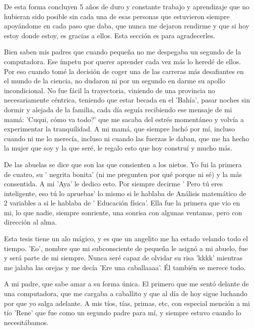 \begin{acknowledgements}
    De esta forma concluyen 5 años de duro y constante trabajo y aprendizaje que no hubieran sido posible sin cada una de esas personas que estuvieron siempre apoyándome en cada paso que daba, que nunca me dejaron rendirme y que si hoy estoy donde estoy, es gracias a ellos. Esta sección es para agradecerles.

    Bien saben mis padres que cuando pequeña no me despegaba un segundo de la computadora. Ese ímpetu por querer aprender cada vez más lo heredé de ellos. Por eso cuando tomé la decisión de coger una de las carreras más desafiantes en el mundo de la ciencia, no dudaron ni por un segundo en darme su apollo incondicional. No fue fácil la trayectoria, viniendo de una provincia no necesariamente céntrica, teniendo que estar becada en el 'Bahía', pasar noches sin dormir y alejada de la familia, cada día seguía recibiendo ese mensaje de mi mamá: 'Cuqui, cómo va todo?' que me sacaba del estrés momentáneo y volvía a experimentar la tranquilidad. A mi mamá, que siempre luchó por mí, incluso cuando ni me lo merecía, incluso ni cuando las fuerzas le daban, que me ha hecho la mujer que soy y la que seré, le regalo esto que hoy construí y mucho más.

    De las abuelas se dice que son las que consienten a los nietos. Yo fui la primera de cuatro, su ' negrita bonita' (ni me pregunten por qué porque ni sé) y la más consentida. A mi 'Aya' le dedico esto. Por siempre decirme ' Pero tú eres inteligente, eso tú lo apruebas' lo mismo si le hablaba de Análisis matemático de 2 variables a si le hablaba de ' Educación física'. Ella fue la primera que vio en mi, lo que nadie, siempre sonriente, una sonrisa con algunas ventanas, pero con dirección al alma.
    
    Esta tesis tiene un alo mágico, y es que un angelito me ha estado velando todo el tiempo. 'Eo', nombre que mi subconsciente de pequeña le asignó a mi abuelo, fue y será parte de mi siempre. Nunca seré capaz de olvidar su risa 'kkkk' mientras me jalaba las orejas y me decía 'Ere una caballaaaa'. Él también se merece todo.

    A mi padre, que sabe amar a su forma única. El primero que me sentó delante de una computadora, que me cargaba a caballito y que al día de hoy sigue luchando por que yo salga adelante. A mis tíos, tías, primas, etc, con especial mención a mi tío 'Rene' que fue como un segundo padre para mí, y siempre estuvo cuando lo necesitábamos.


\end{acknowledgements}
